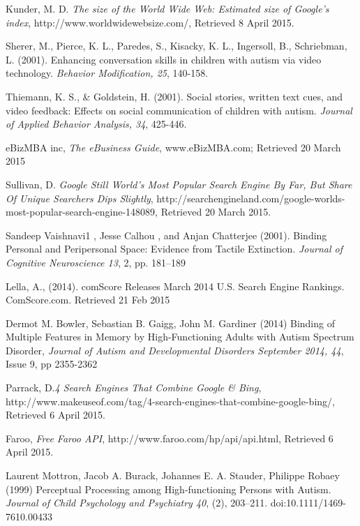 \documentclass[a4paper, 11pt]{article}
\begin{document}
\begin{thebibliography}{100}
 Kunder, M. D. \textit{The size of the World Wide Web: Estimated size of Google's index}, http://www.worldwidewebsize.com/, Retrieved 8 April 2015.


Sherer, M., Pierce, K. L., Paredes, S., Kisacky, K. L., Ingersoll, B., Schriebman, L. (2001). Enhancing conversation skills in children with autism via video technology. \textit{Behavior Modification, 25}, 140-158.


Thiemann, K. S., \& Goldstein, H. (2001). Social stories, written text cues, and video feedback: Effects on social communication of children with autism. \textit{Journal of Applied Behavior Analysis, 34}, 425-446.

eBizMBA inc, \textit{The eBusiness Guide}, www.eBizMBA.com; Retrieved 20 March 2015

Sullivan, D. \textit{Google Still World’s Most Popular Search Engine By Far, But Share Of Unique Searchers Dips Slightly},  http://searchengineland.com/google-worlds-most-popular-search-engine-148089, Retrieved 20 March 2015.  

Sandeep Vaishnavi1 , Jesse Calhou , and Anjan Chatterjee (2001). Binding Personal and Peripersonal Space: Evidence from Tactile Extinction. \textit{Journal of Cognitive Neuroscience 13}, 2, pp. 181–189

Lella, A., (2014). comScore Releases March 2014 U.S. Search Engine Rankings. ComScore.com. Retrieved 21 Feb 2015

Dermot M. Bowler, Sebastian B. Gaigg, John M. Gardiner (2014) Binding of Multiple Features in Memory by High-Functioning Adults with Autism Spectrum Disorder, \textit{Journal of Autism and Developmental Disorders September 2014, 44}, Issue 9, pp 2355-2362

 Parrack, D.\textit{4 Search Engines That Combine Google \& Bing}, http://www.makeuseof.com/tag/4-search-engines-that-combine-google-bing/, Retrieved 6 April 2015.


Faroo, \textit{Free Faroo API}, http://www.faroo.com/hp/api/api.html, Retrieved 6 April 2015.

 Laurent Mottron, Jacob A. Burack, Johannes E. A. Stauder, Philippe Robaey (1999) Perceptual Processing among High-functioning Persons with Autism. \textit{Journal of Child Psychology and Psychiatry 40}, (2), 203–211. doi:10.1111/1469-7610.00433

\end{thebibliography}
\end{document}
